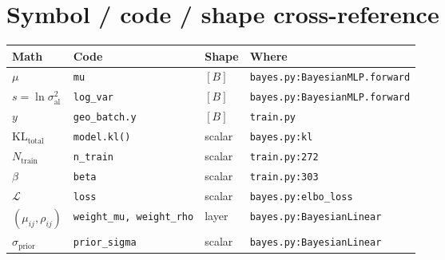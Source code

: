 \documentclass[11pt,a4paper]{article}
\newcommand{\code}[1]{\texttt{#1}}
\newcommand{\KL}{\mathrm{KL}}
\begin{document}
\section{Symbol / code / shape cross-reference}

\begin{center}
\renewcommand{\arraystretch}{1.3}
\begin{tabular}{@{}llll@{}}
\toprule
\textbf{Math} & \textbf{Code} & \textbf{Shape} & \textbf{Where} \\
\midrule
$\mu$ & \code{mu} & $[B]$ & \code{bayes.py:BayesianMLP.forward} \\
$s=\ln\sigma_{\text{al}}^2$ & \code{log\_var} & $[B]$ & \code{bayes.py:BayesianMLP.forward} \\
$y$ & \code{geo\_batch.y} & $[B]$ & \code{train.py} \\
$\KL_{\text{total}}$ & \code{model.kl()} & scalar & \code{bayes.py:kl} \\
$N_{\text{train}}$ & \code{n\_train} & scalar & \code{train.py:272} \\
$\beta$ & \code{beta} & scalar & \code{train.py:303} \\
$\mathcal{L}$ & \code{loss} & scalar & \code{bayes.py:elbo\_loss} \\
$(\mu_{ij},\rho_{ij})$ & \code{weight\_mu,\ weight\_rho} & layer & \code{bayes.py:BayesianLinear} \\
$\sigma_{\text{prior}}$ & \code{prior\_sigma} & scalar & \code{bayes.py:BayesianLinear} \\
\bottomrule
\end{tabular}
\end{center}
\end{document}
